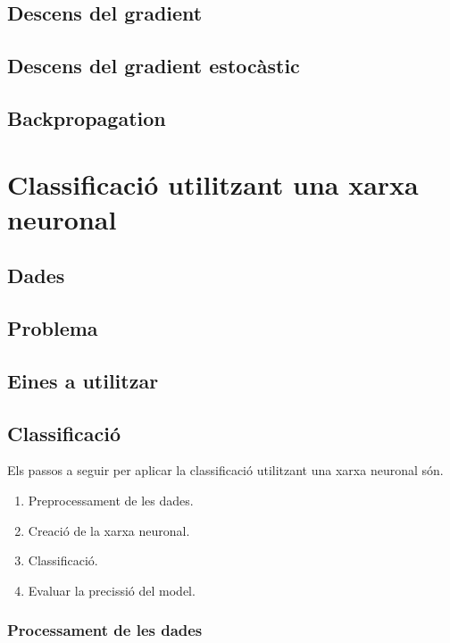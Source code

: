 \documentclass[12pt]{article}
\begin{document}
\subsection{Descens del gradient\label{dg}}


\clearpage
\subsection{Descens del gradient estocàstic\label{dge}}


\clearpage
\subsection{Backpropagation\label{bp}}


\clearpage
\section{Classificació utilitzant una xarxa neuronal}
\subsection{Dades}
\subsection{Problema}
\subsection{Eines a utilitzar}
\subsection{Classificació}
Els passos a seguir per aplicar la classificació utilitzant una xarxa neuronal són.
\begin{enumerate}
	\item Preprocessament de les dades.
	\item Creació de la xarxa neuronal.
	\item Classificació.
	\item Evaluar la precissió del model.
\end{enumerate}
\subsubsection{Processament de les dades}
\end{document}
